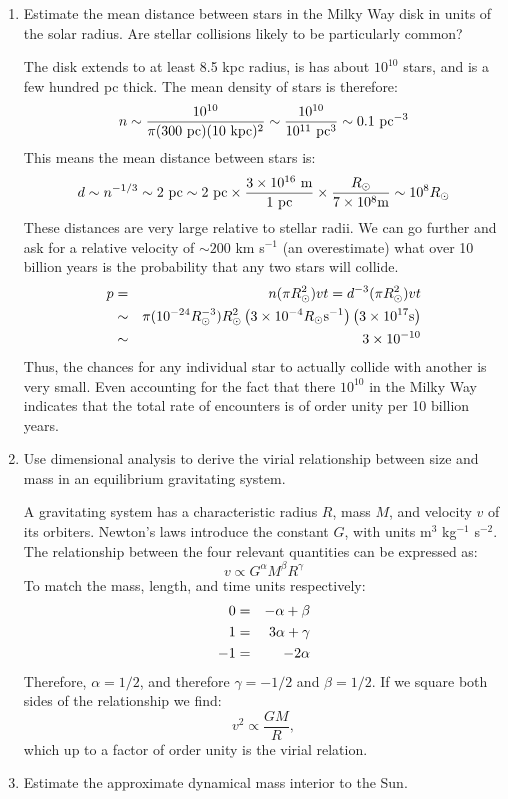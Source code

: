\begin{enumerate} 
\item Estimate the mean distance between stars in the Milky Way disk
  in units of the solar radius. Are stellar collisions likely to be
  particularly common?

\begin{answer}
The disk extends to at least 8.5 kpc radius, is has about $10^{10}$
stars, and is a few hundred pc thick. The mean density of stars is
therefore:
\begin{equation}
n \sim \frac{10^{10}}{\pi (300 {\rm ~pc}) (10 {\rm ~kpc})^2} \sim
\frac{10^{10}}{10^{11} {\rm ~pc}^3} \sim  0.1 {\rm ~pc}^{-3} 
\end{equation}
This means the mean distance between stars is:
\begin{equation}
d \sim n^{-1/3} \sim 2 {\rm ~pc} \sim 2 {\rm ~pc} \times \frac{3 \times
  10^{16} {\rm ~m}}{1 {\rm ~pc}} \times \frac{R_\odot}{7 \times 10^8 {\rm
    m}}
\sim 10^8 R_\odot
\end{equation}
These distances are very large relative to stellar radii. We can go
further and ask for a relative velocity of $\sim 200$ km s$^{-1}$ (an
overestimate) what over 10 billion years is the probability that any
two stars will collide.
\begin{eqnarray}
  p &=& n (\pi R_\odot^2) v t = d^{-3} (\pi R_\odot^2) v t \cr
  &\sim& \pi (10^{-24} R_\odot^{-3}) R_\odot^2 \left(3 \times
  10^{-4} R_\odot {\rm s}^{-1}\right) \left(3 \times 10^{17} {\rm
    s}\right) \cr
  &\sim& 3 \times 10^{-10} 
\end{eqnarray}
Thus, the chances for any individual star to actually collide with
another is very small. Even accounting for the fact that there
$10^{10}$ in the Milky Way indicates that the total rate of encounters
is of order unity per 10 billion years.
\end{answer}
\item Use dimensional analysis to derive the virial relationship
between size and mass in an equilibrium gravitating system.

\begin{answer}
A gravitating system has a characteristic radius $R$, mass $M$, and
velocity $v$ of its orbiters.  Newton's laws introduce the constant
$G$, with units m$^3$ kg$^{-1}$ s$^{-2}$. The relationship between the
four relevant quantities can be expressed as:
\begin{equation}
v \propto G^\alpha M^\beta R^\gamma
\end{equation}
To match the mass, length, and time units respectively:
\begin{eqnarray}
0 &=& -\alpha + \beta \cr
1 &=& 3\alpha + \gamma \cr
- 1 &=& -2 \alpha
\end{eqnarray}
Therefore, $\alpha = 1/2$, and therefore $\gamma = - 1/2$ and
$\beta=1/2$. If we square both sides of the relationship we find:
\begin{equation}
v^2 \propto \frac{G M}{R},
\end{equation}
which up to a factor of order unity is the virial relation. 
\end{answer}
\item Estimate the approximate dynamical mass interior to the Sun. 


\end{enumerate}
